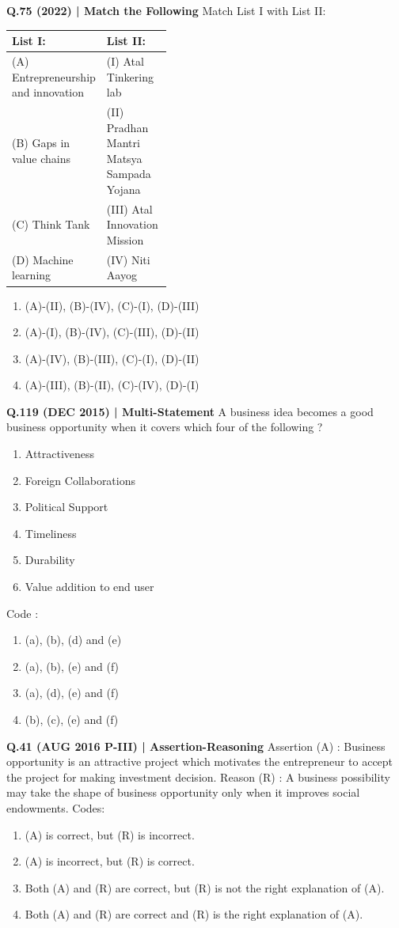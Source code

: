 \documentclass{article}
\begin{document}
\textbf{Q.75 (2022) | Match the Following}
Match List I with List II:
\begin{tabularx}{\linewidth}{@{} p{0.4\linewidth} X @{}}
    \toprule
    \textbf{List I:} & \textbf{List II:} \\
    \midrule
    (A) Entrepreneurship and innovation & (I) Atal Tinkering lab \\
    (B) Gaps in value chains & (II) Pradhan Mantri Matsya Sampada Yojana \\
    (C) Think Tank & (III) Atal Innovation Mission \\
    (D) Machine learning & (IV) Niti Aayog \\
    \bottomrule
\end{tabularx}
\begin{enumerate}[label=(\arabic*)]
    \item (A)-(II), (B)-(IV), (C)-(I), (D)-(III)
    \item (A)-(I), (B)-(IV), (C)-(III), (D)-(II)
    \item (A)-(IV), (B)-(III), (C)-(I), (D)-(II)
    \item (A)-(III), (B)-(II), (C)-(IV), (D)-(I)
\end{enumerate}

\textbf{Q.119 (DEC 2015) | Multi-Statement}
A business idea becomes a good business opportunity when it covers which four of the following ?
\begin{enumerate}[label=(\alph*)]
    \item Attractiveness
    \item Foreign Collaborations
    \item Political Support
    \item Timeliness
    \item Durability
    \item Value addition to end user
\end{enumerate}
Code :
\begin{enumerate}[label=(\arabic*)]
    \item (a), (b), (d) and (e)
    \item (a), (b), (e) and (f)
    \item (a), (d), (e) and (f)
    \item (b), (c), (e) and (f)
\end{enumerate}

\textbf{Q.41 (AUG 2016 P-III) | Assertion-Reasoning}
Assertion (A) : Business opportunity is an attractive project which motivates the entrepreneur to accept the project for making investment decision.
Reason (R) : A business possibility may take the shape of business opportunity only when it improves social endowments.
Codes:
\begin{enumerate}[label=(\arabic*)]
    \item (A) is correct, but (R) is incorrect.
    \item (A) is incorrect, but (R) is correct.
    \item Both (A) and (R) are correct, but (R) is not the right explanation of (A).
    \item Both (A) and (R) are correct and (R) is the right explanation of (A).
\end{enumerate}
\end{document}
